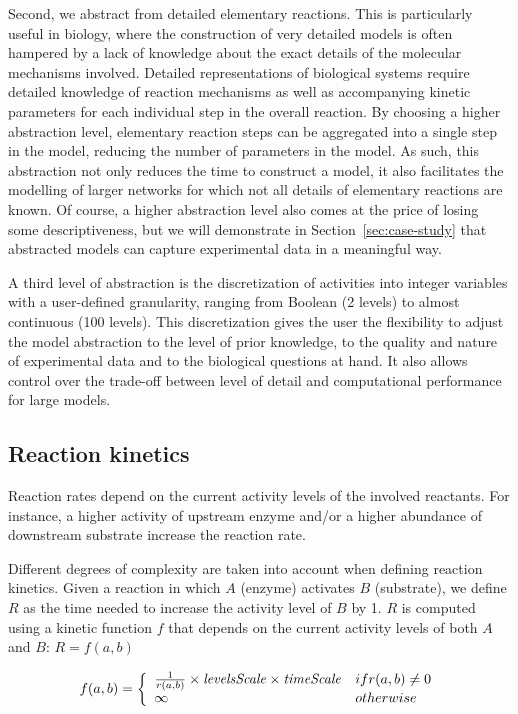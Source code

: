 \documentclass[journal, 10pt]{IEEEtran}
\begin{document}
Second, we abstract from detailed elementary reactions. This is particularly useful in 
biology, where the construction of very detailed models is often hampered by 
a lack of knowledge about the exact details of the molecular mechanisms involved. 
Detailed representations of biological systems require detailed knowledge of reaction mechanisms as well as 
accompanying kinetic parameters for each individual step in the overall reaction. 
By choosing a higher abstraction level, elementary reaction steps can be aggregated into a single step in the model, reducing
the number of parameters in the model. As such, this abstraction not only reduces the time to construct a model, it also facilitates the modelling of larger networks
for which not all details of elementary reactions are known. 
Of course, a higher abstraction level also comes at the price of losing some descriptiveness, but we will demonstrate
in Section~\ref{sec:case-study} that abstracted models can capture experimental data in a meaningful way.

A third level of abstraction is the discretization of activities into integer variables with a user-defined granularity, ranging from Boolean (2 levels) 
to almost continuous (100 levels). This discretization gives the user the flexibility to adjust the model abstraction to the level of 
prior knowledge, to the quality and nature of experimental data and to the biological questions at hand. It also allows 
control over the trade-off between level of detail and computational performance for large models.


\subsection{Reaction kinetics}\label{sec:modeling-framework}
Reaction rates depend on the current activity levels of the involved reactants. For instance, a higher activity of upstream enzyme and/or a higher abundance of 
downstream substrate increase the reaction rate. 

Different degrees of complexity are taken into account when defining reaction kinetics. Given a reaction in which $A$ (enzyme) activates $B$ (substrate), we define $R$ as the time needed to increase the activity level of $B$ by 1. $R$ is computed using a kinetic function $f$ that
depends on the current activity levels of both $A$ and $B$: $R = f(a, b)$

$$
f(a, b) = \left\{ \begin{array}{ll}
		      \frac{1}{r(a, b)} \times \mbox{\it levelsScale} \times \mbox{\it timeScale} & \mbox{ if } r(a, b) \neq 0 \\
		      \infty & \mbox{ otherwise}
                  \end{array} \right.
$$
\end{document}
